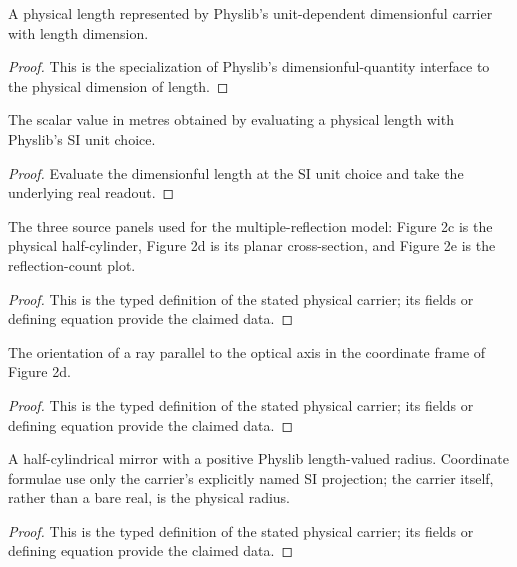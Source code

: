 \begin{definition}
  \label{def:physics:IPhO_2026_2_A_1:length_quantity}
  A physical length represented by Physlib's unit-dependent dimensionful
  carrier with length dimension.
\end{definition}
\begin{proof}
  This is the specialization of Physlib's dimensionful-quantity interface to
  the physical dimension of length.
\end{proof}

\begin{definition}
  \label{def:physics:IPhO_2026_2_A_1:si_length_value}
  The scalar value in metres obtained by evaluating a physical length with
  Physlib's SI unit choice.
\end{definition}
\begin{proof}
  Evaluate the dimensionful length at the SI unit choice and take the
  underlying real readout.
\end{proof}

\begin{definition}
  \label{def:physics:IPhO_2026_2_A_1:aux001}
  The three source panels used for the multiple-reflection model: Figure 2c is the physical half-cylinder, Figure 2d is its planar cross-section, and Figure 2e is the reflection-count plot.
\end{definition}
\begin{proof}
  This is the typed definition of the stated physical carrier; its fields or defining equation provide the claimed data.
\end{proof}

\begin{definition}
  \label{def:physics:IPhO_2026_2_A_1:aux002}
  The orientation of a ray parallel to the optical axis in the coordinate frame of Figure 2d.
\end{definition}
\begin{proof}
  This is the typed definition of the stated physical carrier; its fields or defining equation provide the claimed data.
\end{proof}

\begin{definition}
  \label{def:physics:IPhO_2026_2_A_1:aux003}
  A half-cylindrical mirror with a positive Physlib length-valued radius.
  Coordinate formulae use only the carrier's explicitly named SI projection;
  the carrier itself, rather than a bare real, is the physical radius.
\end{definition}
\begin{proof}
  This is the typed definition of the stated physical carrier; its fields or defining equation provide the claimed data.
\end{proof}

